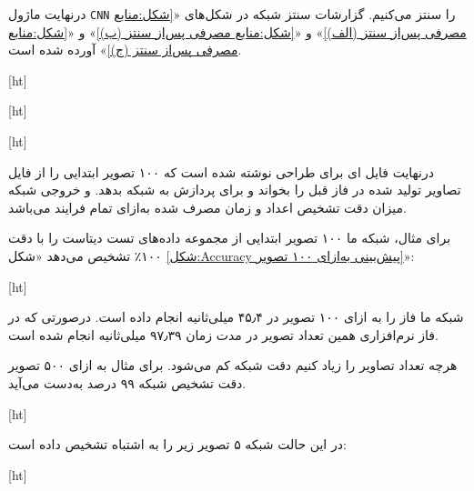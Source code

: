 درنهایت ماژول \texttt{CNN} را سنتز می‌کنیم. گزارشات سنتز شبکه در شکل‌های «\ref{شکل:منابع مصرفی پس‌از سنتز (الف)}» و «\ref{شکل:منابع مصرفی پس‌از سنتز (ب)}» و «\ref{شکل:منابع مصرفی پس‌از سنتز (ج)}» آورده شده است.





[ht]


[ht]


[ht]





درنهایت فایل  ای برای طراحی نوشته شده است که ۱۰۰ تصویر ابتدایی را از فایل تصاویر تولید شده در فاز قبل را بخواند و برای پردازش به شبکه بدهد. و خروجی شبکه میزان دقت تشخیص اعداد و زمان مصرف شده به‌ازای تمام فرایند می‌باشد.


برای مثال، شبکه ما ۱۰۰ تصویر ابتدایی از مجموعه داده‌های تست دیتاست  را با دقت ۱۰۰٪ تشخیص می‌دهد «شکل \ref{شکل:Accuracy پیش‌بینی به‌ازای ۱۰۰ تصویر}»:



[ht]






شبکه ما فاز  را به ازای ۱۰۰ تصویر در ۴۵٫۴ میلی‌ثانیه انجام داده است. درصورتی که در فاز نرم‌افزاری همین تعداد تصویر در مدت زمان ۹۷٫۳۹ میلی‌ثانیه انجام شده است. \newpage


هرچه تعداد تصاویر را زیاد کنیم دقت شبکه کم می‌شود. برای مثال به ازای ۵۰۰ تصویر دقت تشخیص شبکه ۹۹ درصد به‌دست می‌آید.

[ht]
\newpage




در این حالت شبکه ۵ تصویر زیر را به اشتباه تشخیص داده است:

[ht]




